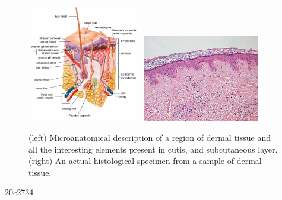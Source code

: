     \begin{figure}
        \centering
        \includegraphics[width = 0.45\textwidth]{images/derm_scheme}
        \includegraphics[width = 0.45\textwidth]{images/derm_specimen}

        \caption{(left) Microanatomical description of a region of dermal tissue and all the interesting elements present in cutis, and subcutaneous layer. (right) An actual histological specimen from a sample of dermal tissue.}
        \label{fig:derm_descr}
    \end{figure}

20c2734
